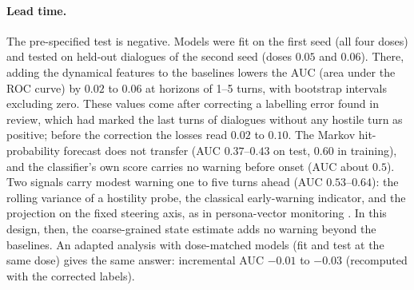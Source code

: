 \paragraph{Lead time.} The pre-specified test is negative. Models were fit on the first seed (all four doses) and
tested on held-out dialogues of the second seed (doses $0.05$ and $0.06$). There, adding the dynamical features to the
baselines lowers the AUC (area under the ROC curve) by $0.02$ to $0.06$ at horizons of 1--5 turns, with bootstrap
intervals excluding zero. These values come after correcting a labelling error found in review, which had marked the
last turns of dialogues without any hostile turn as positive; before the correction the losses read $0.02$ to $0.10$.
The Markov hit-probability forecast does not transfer (AUC $0.37$--$0.43$ on test, $0.60$ in training), and the
classifier's own score carries no warning before onset (AUC about $0.5$). Two signals carry modest warning one to five
turns ahead (AUC $0.53$--$0.64$): the rolling variance of a hostility probe, the classical early-warning indicator,
and the projection on the fixed steering axis, as in persona-vector monitoring \cite{chen2025persona}. In this design,
then, the coarse-grained state estimate adds no warning beyond the baselines. An adapted analysis with dose-matched
models (fit and test at the same dose) gives the same answer: incremental AUC $-0.01$ to $-0.03$ (recomputed with the
corrected labels).

